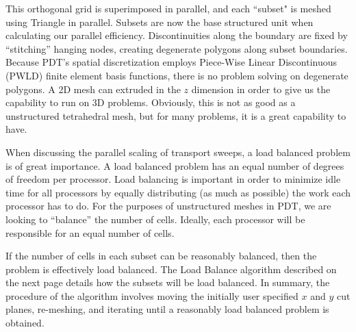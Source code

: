 \documentclass[11pt, letterpaper,titlepage,oneside]{article}
\begin{document}
This orthogonal grid is superimposed in parallel, and each ``subset" is meshed using Triangle in parallel.  Subsets are now the base structured unit when calculating our parallel efficiency. Discontinuities along the boundary are fixed by ``stitching'' hanging nodes, creating degenerate polygons along subset boundaries. Because PDT's spatial discretization employs Piece-Wise Linear Discontinuous (PWLD) finite element basis functions, there is no problem solving on degenerate polygons. A 2D mesh can extruded in the $z$ dimension in order to give us the capability to run on 3D problems. Obviously, this is not as good as a unstructured tetrahedral mesh, but for many problems, it is a great capability to have. 

When discussing the parallel scaling of transport sweeps, a load balanced problem is of great importance. A load balanced problem has an equal number of degrees of freedom per processor. Load balancing is important in order to minimize idle time for all processors by equally distributing (as much as possible) the work each processor has to do.  For the purposes of unstructured meshes in PDT, we are looking to ``balance'' the number of cells. Ideally, each processor will be responsible for an equal number of cells. 

If the number of cells in each subset can be reasonably balanced, then the problem is effectively load balanced. The Load Balance algorithm described on the next page details how the subsets will be load balanced. In summary, the procedure of the algorithm involves moving the initially user specified $x$ and $y$ cut planes, re-meshing, and iterating until a reasonably load balanced problem is obtained. 
\end{document}
